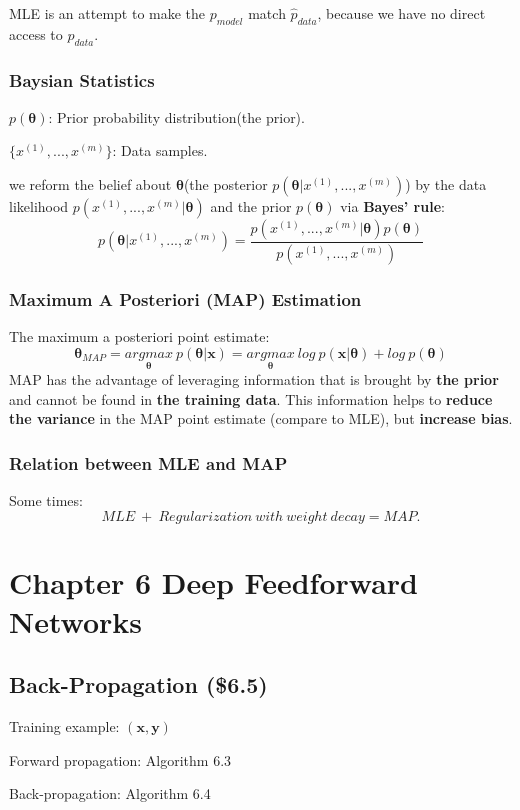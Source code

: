 \documentclass[12pt]{article}
\numberwithin{equation}{section}
\begin{document}
MLE is an attempt to make the $p_{model}$ match $\hat{p}_{data}$, because we have no direct access to $p_{data}$.
\subsubsection{Baysian Statistics}
$p(\boldsymbol\theta)$: Prior probability distribution(the prior).

$\{x^{(1)},...,x^{(m)}\}$: Data samples.

we reform the belief about $\boldsymbol\theta$(the posterior $p(\boldsymbol\theta|x^{(1)},...,x^{(m)})$) by the data likelihood $p(x^{(1)},...,x^{(m)}|\boldsymbol\theta)$ and the prior $p(\boldsymbol\theta)$ via \textbf{Bayes' rule}: \[
p(\boldsymbol\theta|x^{(1)},...,x^{(m)})=\frac{p(x^{(1)},...,x^{(m)}|\boldsymbol\theta)p(\boldsymbol\theta)}{p(x^{(1)},...,x^{(m)})}
\]
\subsubsection{Maximum A Posteriori (MAP) Estimation}
The maximum a posteriori point estimate:
\[
\boldsymbol\theta_{MAP}=\underset{\boldsymbol\theta}{argmax} \  p(\boldsymbol{\theta|x})=\underset{\boldsymbol\theta}{argmax} \ log \  p(\boldsymbol{x|\theta})+log\ p(\boldsymbol{\theta})
\]
MAP has the advantage of leveraging information that is brought by \textbf{the prior} and cannot be found in \textbf{the training data}. This information helps to \textbf{reduce the variance} in the MAP point estimate (compare to MLE), but \textbf{increase bias}.

\subsubsection{Relation between MLE and MAP}
Some times:
\[
MLE \ + \ Regularization\ with\ weight\ decay = MAP .
\]
\section{Chapter 6 Deep Feedforward Networks}
\subsection{Back-Propagation (\$6.5)}
Training example: $(\mathbf{x}, \mathbf{y})$

Forward propagation: Algorithm 6.3 

Back-propagation: Algorithm 6.4
\end{document}
